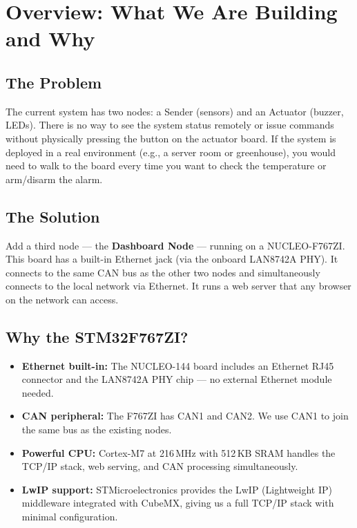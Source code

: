 \documentclass[11pt,a4paper]{article}
\begin{document}
\newpage

\section{Overview: What We Are Building and Why}

\subsection*{The Problem}
The current system has two nodes: a Sender (sensors) and an Actuator (buzzer, LEDs). There is no way to see the system status remotely or issue commands without physically pressing the button on the actuator board. If the system is deployed in a real environment (e.g., a server room or greenhouse), you would need to walk to the board every time you want to check the temperature or arm/disarm the alarm.

\subsection*{The Solution}
Add a third node --- the \textbf{Dashboard Node} --- running on a NUCLEO-F767ZI. This board has a built-in Ethernet jack (via the onboard LAN8742A PHY). It connects to the same CAN bus as the other two nodes and simultaneously connects to the local network via Ethernet. It runs a web server that any browser on the network can access.

\subsection*{Why the STM32F767ZI?}
\begin{itemize}[leftmargin=2em]
  \item \textbf{Ethernet built-in:} The NUCLEO-144 board includes an Ethernet RJ45 connector and the LAN8742A PHY chip --- no external Ethernet module needed.
  \item \textbf{CAN peripheral:} The F767ZI has CAN1 and CAN2. We use CAN1 to join the same bus as the existing nodes.
  \item \textbf{Powerful CPU:} Cortex-M7 at 216\,MHz with 512\,KB SRAM handles the TCP/IP stack, web serving, and CAN processing simultaneously.
  \item \textbf{LwIP support:} STMicroelectronics provides the LwIP (Lightweight IP) middleware integrated with CubeMX, giving us a full TCP/IP stack with minimal configuration.
\end{itemize}
\end{document}
